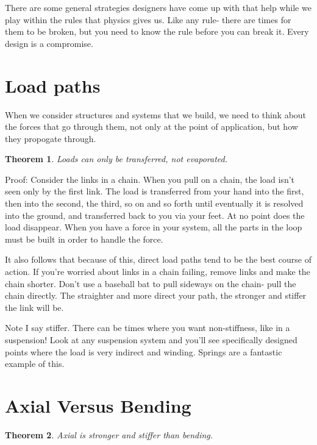 \documentclass[10pt,letterpaper]{book}
\newtheorem{theorem}{Theorem}
\begin{document}
There are some general strategies designers have come up with that help while we play within the rules that physics gives us. Like any rule- there are times for them to be broken, but you need to know the rule before you can break it. Every design is a compromise.

\section{Load paths}

When we consider structures and systems that we build, we need to think about the forces that go through them, not only at the point of application, but how they propogate through.

\begin{theorem} \label{theorem:load_paths}
	Loads can only be transferred, not evaporated.
\end{theorem}

Proof: Consider the links in a chain. When you pull on a chain, the load isn't seen only by the first link. The load is transferred from your hand into the first, then into the second, the third, so on and so forth until eventually it is resolved into the ground, and transferred back to you via your feet. At no point does the load disappear. When you have a force in your system, all the parts in the loop must be built in order to handle the force.

It also follows that because of this, direct load paths tend to be the best course of action. If you're worried about links in a chain failing, remove links and make the chain shorter. Don't use a baseball bat to pull sideways on the chain- pull the chain directly. The straighter and more direct your path, the stronger and stiffer the link will be.

Note I say stiffer. There can be times where you want non-stiffness, like in a suspension! Look at any suspension system and you'll see specifically designed points where the load is very indirect and winding. Springs are a fantastic example of this.

\section{Axial Versus Bending}

\begin{theorem} \label{theorem:axial_bending}
	Axial is stronger and stiffer than bending.
\end{theorem}
\end{document}

